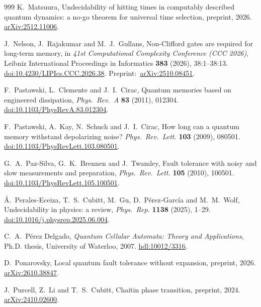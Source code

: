 \begin{thebibliography}{999}
K.~Matsuura,
Undecidability of hitting times in computably described quantum dynamics: a no-go theorem for universal time selection,
preprint, 2026.
\href{https://arxiv.org/abs/2512.11006}{arXiv:2512.11006}.

J.~Nelson, J.~Rajakumar and M.~J.~Gullans,
Non-Clifford gates are required for long-term memory,
in \emph{41st Computational Complexity Conference (CCC 2026)},
Leibniz International Proceedings in Informatics
\textbf{383} (2026), 38:1--38:13.
\href{https://doi.org/10.4230/LIPIcs.CCC.2026.38}{doi:10.4230/LIPIcs.CCC.2026.38}.
Preprint:~\href{https://arxiv.org/abs/2510.08451}{arXiv:2510.08451}.

F.~Pastawski, L.~Clemente and J.~I.~Cirac,
Quantum memories based on engineered dissipation,
\emph{Phys.~Rev.~A} \textbf{83} (2011), 012304.
\href{https://doi.org/10.1103/PhysRevA.83.012304}{doi:10.1103/PhysRevA.83.012304}.

F.~Pastawski, A.~Kay, N.~Schuch and J.~I.~Cirac,
How long can a quantum memory withstand depolarizing noise?
\emph{Phys.~Rev.~Lett.} \textbf{103} (2009), 080501.
\href{https://doi.org/10.1103/PhysRevLett.103.080501}{doi:10.1103/PhysRevLett.103.080501}.

G.~A.~Paz-Silva, G.~K.~Brennen and J.~Twamley,
Fault tolerance with noisy and slow measurements and preparation,
\emph{Phys.~Rev.~Lett.} \textbf{105} (2010), 100501.
\href{https://doi.org/10.1103/PhysRevLett.105.100501}{doi:10.1103/PhysRevLett.105.100501}.

\'{A}.~Perales-Eceiza, T.~S.~Cubitt, M.~Gu, D.~P\'erez-Garc\'ia and M.~M.~Wolf,
Undecidability in physics: a review,
\emph{Phys.~Rep.} \textbf{1138} (2025), 1--29.
\href{https://doi.org/10.1016/j.physrep.2025.06.004}{doi:10.1016/j.physrep.2025.06.004}.

C.~A.~P\'erez Delgado,
\emph{Quantum Cellular Automata: Theory and Applications},
Ph.D. thesis, University of Waterloo, 2007.
\href{https://hdl.handle.net/10012/3316}{hdl:10012/3316}.

D.~Ponarovsky,
Local quantum fault tolerance without expansion,
preprint, 2026.
\href{https://arxiv.org/abs/2610.38847}{arXiv:2610.38847}.

J.~Purcell, Z.~Li and T.~S.~Cubitt,
Chaitin phase transition,
preprint, 2024.
\href{https://arxiv.org/abs/2410.02600}{arXiv:2410.02600}.


\end{thebibliography}

